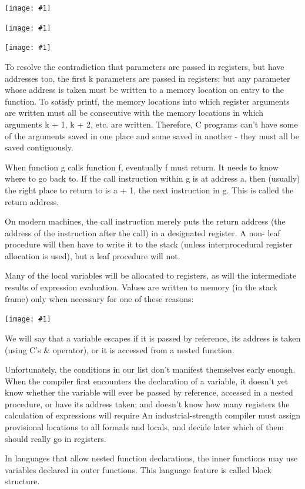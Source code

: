 \documentclass[8pt, a4paper, oneside, twocolumn]{extarticle}
\newcommand{\ph}[1]{
    \texttt{[image: \#1]}
}
\begin{document}
\ph{r9}

\ph{r10}

\ph{r11}

To resolve the contradiction that
parameters are passed in registers, but have addresses too, the first k 
parameters are passed in registers; but any parameter whose address is taken must
be written to a memory location on entry to the function. To satisfy printf,
the memory locations into which register arguments are written must all be
consecutive with the memory locations in which arguments k + 1, k + 2, etc.
are written. Therefore, C programs can't have some of the arguments saved
in one place and some saved in another - they must all be saved contiguously.

When function g calls function f, eventually f must return. It needs to know
where to go back to. If the call instruction within g is at address a, then
(usually) the right place to return to is a + 1, the next instruction in g. This is
called the return address.

On modern machines, the call instruction merely puts the return address
(the address of the instruction after the call) in a designated register. A non-
leaf procedure will then have to write it to the stack (unless interprocedural
register allocation is used), but a leaf procedure will not.

Many of the local variables will be allocated to registers, as will the
intermediate results of expression evaluation. Values are written to memory
(in the stack frame) only when necessary for one of these reasons:

\ph{r12}

We will say that a variable escapes if it is passed by reference, its address
is taken (using C's \& operator), or it is accessed from a nested function.

Unfortunately, the conditions in our list don't manifest
themselves early enough. When the compiler first encounters the declaration
of a variable, it doesn't yet know whether the variable will ever be passed
by reference, accessed in a nested procedure, or have its address taken; and
doesn't know how many registers the calculation of expressions will require
An industrial-strength compiler must assign provisional locations
to all formals and locals, and decide later which of them should really go in registers.

In languages that allow nested function declarations, the inner functions may use variables declared in outer functions. This
language feature is called block structure.
\end{document}
